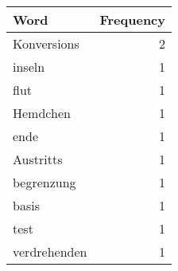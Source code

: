 \begin{tabular}{lr}
\toprule
Word & Frequency \\
\midrule
Konversions & 2 \\
inseln & 1 \\
flut & 1 \\
Hemdchen & 1 \\
ende & 1 \\
Austritts & 1 \\
begrenzung & 1 \\
basis & 1 \\
test & 1 \\
verdrehenden & 1 \\
\bottomrule
\end{tabular}
